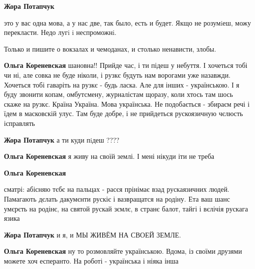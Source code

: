 \begin{itemize}

\textbf{Жора Потапчук} 

это у вас одна мова, а у нас две, так было, есть и будет. Якщо не розумiеш,
можу перекласти. Недо лугi i неспроможнi.

Только и пишите о вокзалах и чемоданах, и столько ненависти, злобы.


\textbf{Ольга Кореневская} шановна!! Прийде час, і ти підеш у небуття. І хочеться тобі чи ні, але совка не буде ніколи, і рузкє будуть нам ворогами уже назавжди. Хочеться тобі гаваріть на рузкє - будь ласка. Але для інших - українською. І я буду звонити копам, омбутсмену, журналістам щоразу, коли хтось там шось скаже на рузкє. Країна Україна. Мова українська. Не подобається - збираєм речі і їдем в масковскій улус. Там буде добре, і не прийдеться рускоязичную чєлюсть ісправлять


\textbf{Жора Потапчук} а ти куди пiдеш ????


\textbf{Ольга Кореневская} я живу на своїй землі. І мені нікуди іти не треба


\textbf{Ольга Кореневская} 

сматрі: абісняю тєбє на пальцах - расєя прінімає
взад рускаязичних людей. Памагають дєлать дакумєнти рускіє і вазвращатся на
родіну. Ета ваш шанс умєрєть на родінє, на святой рускай зємлє, в странє балот,
тайгі і вєлічія рускага язика



\textbf{Жора Потапчук} и я, и МЫ ЖИВЁМ НА СВОЕЙ ЗЕМЛЕ.


\textbf{Ольга Кореневская} ну то розмовляйте українською. Вдома, із своїми друзями можете хоч есперанто. На роботі - українська і ніяка інша


\end{itemize}
